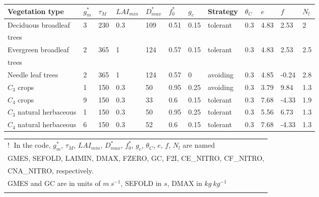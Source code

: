 {\begin{table}
			\begin{center}
			\begin{tabular}{llllllllllll}\label{tab2.1} \\
\hline
	Vegetation type		 &  $g_{m}^{*}$  & $\tau_{M}$   &   $LAI_{min}$  &  $D_{max}^{*}$  &  $f_{0}^{*}$   &  $g_{c}$  &  Strategy &  $\theta_{C}$ & $e$ & $f$ & $N_{l}$ \\
\hline
Deciduous  broadleaf & 3 & 230 & 0.3 & 109 &  0.51 & 0.15 &  tolerant &  0.3  &  4.83  &  2.53  & 2    \\
trees                &   &     &     &     &       &      &           &       &        &        &      \\
Evergreen broadleaf  & 2 & 365 & 1   & 124 &  0.57 & 0.15 &  tolerant &  0.3  &  4.83  &  2.53  & 2.5  \\
trees                &   &     &     &     &       &      &           &       &        &        &      \\
Needle leaf trees    & 2 & 365 & 1   & 124 &  0.57 & 0    &  avoiding &  0.3  &  4.85  &  -0.24 & 2.8  \\
$C_{3}$ crops             & 1 & 150 & 0.3 & 50  &  0.95 & 0.25 &  avoiding &  0.3  &  3.79  &   9.84 & 1.3  \\
$C_{4}$ crops             & 9 & 150 & 0.3 & 33  &  0.6  & 0.15 &  tolerant &  0.3  &  7.68  &  -4.33 & 1.9  \\
$C_{3}$ natural herbaceous& 1 & 150 & 0.3 & 50  &  0.95 & 0.25 &  tolerant &  0.3  &  5.56  &   6.73 & 1.3  \\
$C_{4}$ natural herbaceous& 6 & 150 & 0.3 & 52  &  0.6  & 0.15 &  tolerant &  0.3  &  7.68  &  -4.33 & 1.3  \\
\hline
			\end{tabular}
			\end{center}
\end{table}


{\bf{
			\begin{center}
			\begin{tabular}{|l|}
\hline
 \textcircled{!} In the code, $g_{m}^{*}$, $\tau_{M}$, $LAI_{min}$, $D_{max}^{*}$, $f_{0}^{*}$, $g_{c}$, $\theta_{C}$, $e$, $f$, $N_{l}$ are named \\
GMES, SEFOLD, LAIMIN, DMAX, FZERO, GC, F2I, CE\_NITRO, CF\_NITRO, \\ CNA\_NITRO, respectively. \\
GMES and GC are in units of $m ~s^{-1}$, SEFOLD in $s$, DMAX in $kg ~kg^{-1}$ \\ \\


\end{tabular}
\end{center}}}}

